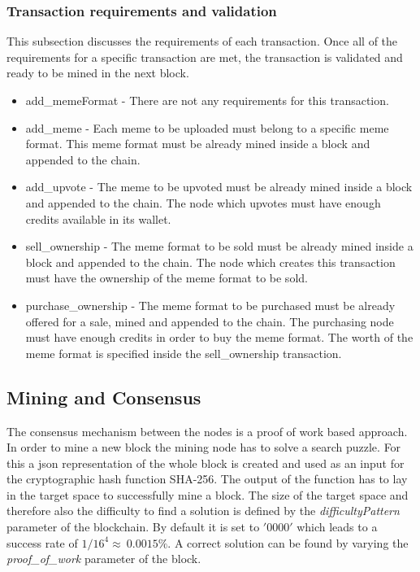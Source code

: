 \documentclass[12pt]{article}
\begin{document}
\subsubsection{Transaction requirements and validation}

This subsection discusses the requirements of each transaction. Once all of the requirements for a specific transaction are met, the transaction is validated and ready to be mined in the next block.

\begin{itemize}
\item add\_memeFormat - There are not any requirements for this transaction.

\item add\_meme - Each meme to be uploaded must belong to a specific meme format. This meme format must be already mined inside a block and appended to the chain.

\item add\_upvote - The meme to be upvoted must be already mined inside a block and appended to the chain. The node which upvotes must have enough credits available in its wallet.

\item sell\_ownership - The meme format to be sold must be already mined inside a block and appended to the chain. The node which creates this transaction must have the ownership of the meme format to be sold.

\item purchase\_ownership - The meme format to be purchased must be already offered for a sale, mined and appended to the chain. The purchasing node must have enough credits in order to buy the meme format. The worth of the meme format is specified inside the sell\_ownership transaction.
\end{itemize}


\subsection{Mining and Consensus} %

The consensus mechanism between the nodes is a proof of work based approach. In order to mine a new block the mining node has to solve a search puzzle. For this a json representation of the whole block is created and used as an input for the cryptographic hash function SHA-256. The output of the function has to lay in the target space to successfully mine a block. 
The size of the target space and therefore also the difficulty to find a solution is defined by the \textit{difficultyPattern} parameter of the blockchain. 
By default it is set to $'0000'$ which leads to a success rate of $1/16^4\approx~0.0015\%$. 
A correct solution can be found by varying the \textit{proof\_of\_work} parameter of the block.
\end{document}
